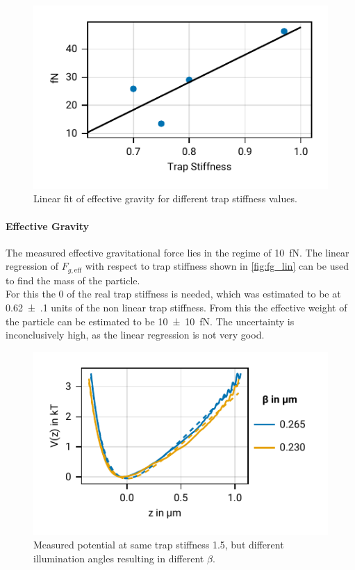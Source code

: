 \documentclass[
    twoside=false,
    twocolumn=true,
    fontsize=11pt,
]{scrarticle}
\begin{document}
\begin{figure}
    \centering
    \includegraphics{figures/02_05_02_gravity.pdf}
    \caption{Linear fit of effective gravity for different trap stiffness values.}
    \label{fig:fg_lin}
\end{figure}
\paragraph{Effective Gravity}
The measured effective gravitational force lies in the regime of \SI{10}{\femto N}.
The linear regression of $F_{g,\text{eff}}$ with respect to trap stiffness shown in \autoref{fig:fg_lin} can be used to find the mass of the particle. \\
For this the $0$ of the real trap stiffness is needed, which was estimated to be at \SI{.62(10)}{} units of the non linear trap stiffness.
From this the effective weight of the particle can be estimated to be \SI{10(10)}{\femto N}.
The uncertainty is inconclusively high, as the linear regression is not very good.

\begin{figure}
    \centering
    \includegraphics{figures/02_06_01_different_beta.pdf}
    \caption{Measured potential at same trap stiffness \SI{1.5}{}, but different illumination angles resulting in different $\beta$.}
    \label{fig:pot_ts_1_5}
\end{figure}
\end{document}
